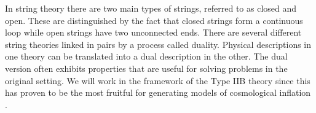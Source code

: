 In string theory there are two main
types of strings, referred to as closed and open. These are distinguished by the fact
that closed
strings form a continuous loop while open strings have two unconnected ends. 
% 
There are several different string theories linked in pairs by a process
called
duality. Physical descriptions in one theory can be translated into a
dual description in the other. The dual version often exhibits properties that
are useful for solving problems in the original setting.
We will work in the framework of the Type IIB theory since this has proven
to be the most
fruitful for generating models of cosmological inflation \cite{cline,
Linde:2005dd}. 
% 


